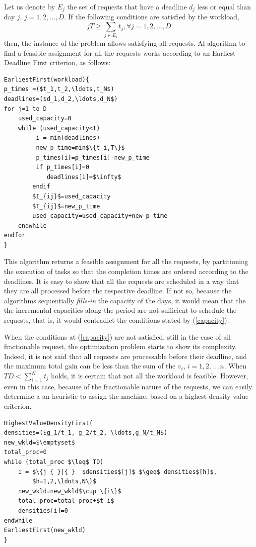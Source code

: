 \documentclass{IEEEtran}
\begin{document}
Let us denote by $E_j$ the set of requests that have a deadline $d_j$ less or equal than day $j$, $j=1,2,\ldots,D$. 
If the following conditions are satisfied by the workload, 
\begin{equation}
j T  \geq \sum_{j \in E_i}t_j , \forall j=1,2,…,D
\label{capacity}
\end{equation} 
 then, the instance of the problem allows satisfying all requests. 
 Al algorithm to find a feasible  assignment for all the requests  works according to an Earliest Deadline First criterion, as follows: 
 \begin{lstlisting}[mathescape]
EarliestFirst(workload){
p_times =($t_1,t_2,\ldots,t_N$)
deadlines=($d_1,d_2,\ldots,d_N$)
for j=1 to D
	used_capacity=0
	while (used_capacity<T) 
		 i = min(deadlines) 
		 new_p_time=min$\{t_i,T\}$
		 p_times[i]=p_times[i]-new_p_time
		 if p_times[i]=0 
		 	deadlines[i]=$\infty$
		endif
		$I_{ij}$=used_capacity
		$T_{ij}$=new_p_time
		used_capacity=used_capacity+new_p_time
	endwhile
endfor
}
\end{lstlisting}

 This algorithm returns a feasible assignment for all the requests, by partitioning the execution of tasks so that the completion times are ordered according to the deadlines.
 It is easy to show that all the requests are scheduled in a way that they are all processed before the respective deadline. If not so, because the algorithms sequentially {\em fills-in} the capacity of the days, it would mean that the the incremental capacities along the period are not sufficient to schedule the requests, that is, it would contradict the conditions stated by (\ref{capacity}).
 
When the conditions at (\ref{capacity}) are not satisfied, still in the case of all fractionable request, the optimization problem starts to show its complexity. Indeed, it is not said that all requests are processable before their deadline, and the maximum total gain can be less than the sum of the $v_i$, $i=1,2,\ldots.n$. 
When $TD <  \sum_{i=1} ^N t_j$  holds, it is certain that not all the workload is feasible. 
However, even in this case, because of the fractionable nature of the requests, we can easily determine a an heuristic to assign the machine, based on a highest density value criterion.  
\begin{lstlisting}[mathescape]
HighestValueDensityFirst{
densities=($g_1/t_1, g_2/t_2, \ldots,g_N/t_N$)
new_wkld=$\emptyset$
total_proc=0
while (total_proc $\leq$ TD) 
	i = $\{j { }|{ }  $densities$[j]$ $\geq$ densities$[h]$, 
	    $h=1,2,\ldots,N\}$ 
	new_wkld=new_wkld$\cup \{i\}$
	total_proc=total_proc+$t_i$
	densities[i]=0
endwhile
EarliestFirst(new_wkld)
} 
\end{lstlisting}
\end{document}
